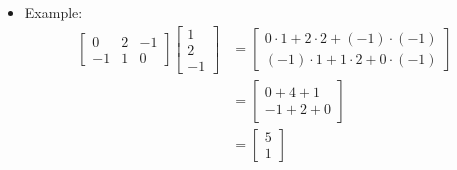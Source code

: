 \begin{frame}
    \begin{itemize}
        \item Example:
            \begin{align*}
                \begin{bmatrix}
                    0 & 2 & -1\\
                    -1 & 1 & 0 
                \end{bmatrix}\begin{bmatrix}
                    1\\
                    2\\
                    -1
                \end{bmatrix} & = \begin{bmatrix}
                    0 \cdot 1 + 2 \cdot 2 + (-1) \cdot (-1)\\
                    (-1) \cdot 1 + 1 \cdot 2 + 0 \cdot (-1)
                \end{bmatrix}\\
                &  = \begin{bmatrix}
                    0 + 4 + 1\\
                    -1 + 2 + 0
                \end{bmatrix} \\
               &  = \begin{bmatrix}
                    5\\
                    1
                \end{bmatrix}
            \end{align*}
    
    \end{itemize}
\end{frame}



